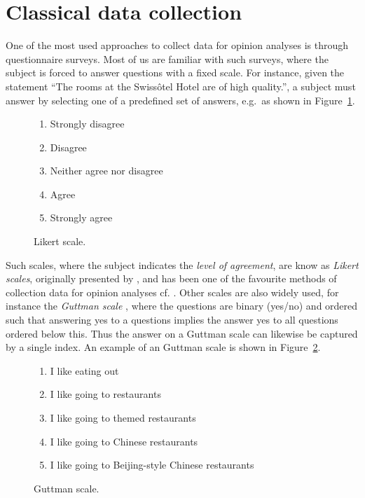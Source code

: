 \section{Classical data collection}
One of the most used approaches to collect data for opinion analyses is through questionnaire surveys. Most of us are familiar with such surveys, where the subject is forced to answer questions with a fixed scale. For instance, given the statement ``The rooms at the Swissôtel Hotel are of high quality.'', a subject must answer by selecting one of a predefined set of answers, e.g.\ as shown in Figure~\ref{fig:LikertScale}.
\begin{figure}[ht]
	\begin{cframed}{.7\textwidth}
		\begin{enumerate}
		  \item Strongly disagree
		  \item Disagree
		  \item Neither agree nor disagree
		  \item Agree
		  \item Strongly agree
		\end{enumerate}
	\end{cframed}
	\caption{Likert scale.}
	\label{fig:LikertScale}
\end{figure}

Such scales, where the subject indicates the \emph{level of agreement}, are know as \emph{Likert scales}, originally presented by \citeauthor{Likert} , and has been one of the favourite methods of collection data for opinion analyses cf. \cite{?}. Other scales are also widely used, for instance the \emph{Guttman scale} \cite{?}, where the questions are  binary (yes/no) and ordered such that answering yes to a questions implies the answer yes to all questions ordered below this. Thus the answer on a Guttman scale can likewise be captured by a single index. An example of an Guttman scale is shown in Figure~\ref{fig:GuttmanScale}.
\begin{figure}[ht]
	\begin{cframed}{.7\textwidth}
		\begin{enumerate}
		  \item I like eating out
		  \item I like going to restaurants
		  \item I like going to themed restaurants
		  \item I like going to Chinese restaurants
		  \item I like going to Beijing-style Chinese restaurants
		\end{enumerate}
	\end{cframed}
	\caption{Guttman scale.}
	\label{fig:GuttmanScale}
\end{figure}

